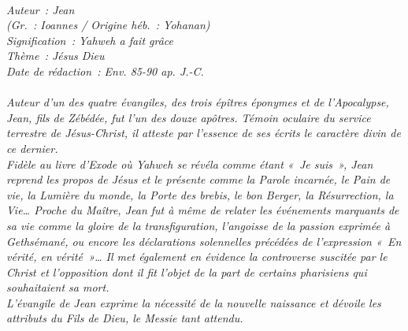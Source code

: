 \BFont
\noindent\hrulefill
{\footnotesize
\textit{
\bigskip
{\centering{}
\\Auteur~: Jean
\\(Gr.~: Ioannes / Origine héb.~: Yohanan)
\\Signification~: Yahweh a fait grâce
\\Thème~: Jésus Dieu
\\Date de rédaction~: Env. 85-90 ap. J.-C.\\}
}
\textit{
\\Auteur d'un des quatre évangiles, des trois épîtres éponymes et de l'Apocalypse, Jean, fils de Zébédée, fut l'un des douze apôtres. Témoin oculaire du service terrestre de Jésus-Christ, il atteste par l'essence de ses écrits le caractère divin de ce dernier.
\\Fidèle au livre d'Exode où Yahweh se révéla comme étant «~Je suis~», Jean reprend les propos de Jésus et le présente comme la Parole incarnée, le Pain de vie, la Lumière du monde, la Porte des brebis, le bon Berger, la Résurrection, la Vie… Proche du Maître, Jean fut à même de relater les événements marquants de sa vie comme la gloire de la transfiguration, l'angoisse de la passion exprimée à Gethsémané, ou encore les déclarations solennelles précédées de l'expression «~En vérité, en vérité~»… Il met également en évidence la controverse suscitée par le Christ et l'opposition dont il fit l'objet de la part de certains pharisiens qui souhaitaient sa mort.
\\L'évangile de Jean exprime la nécessité de la nouvelle naissance et dévoile les attributs du Fils de Dieu, le Messie tant attendu.\bigskip
}
}
\par\nobreak\noindent\hrulefill
